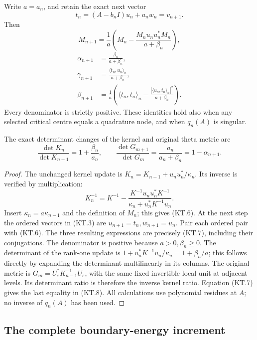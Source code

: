 \begin{theorem}
Write \(a=a_n\), and retain the exact next vector
\[
 t_n=(A-b_nI)u_n+a_nw_n=v_{n+1}.                         \tag{KT.5}
\]
Then
\[
 \boxed{M_{n+1}=\frac1a\left(M_n-
          \frac{M_nu_nu_n^*M_n}{a+\beta_n}\right),}       \tag{KT.6}
\]
\[
 \boxed{\begin{aligned}
 \alpha_{n+1}&=\frac{\beta_n}{a+\beta_n},\\
 \gamma_{n+1}&=\frac{\langle t_n,u_n\rangle_n}{a+\beta_n},\\
 \beta_{n+1}&=\frac1a\left(\langle t_n,t_n\rangle_n
             -\frac{|\langle u_n,t_n\rangle_n|^2}
                         {a+\beta_n}\right).
 \end{aligned}}                                         \tag{KT.7}
\]
Every denominator is strictly positive.  These identities hold
also when any selected critical centre equals a quadrature node,
and when \(q_n(A)\) is singular.

The exact determinant changes of the kernel and original theta
metric are
\[
 \boxed{\frac{\det K_n}{\det K_{n-1}}=1+\frac{\beta_n}{a_n},
 \qquad
 \frac{\det G_{m+1}}{\det G_m}
       =\frac{a_n}{a_n+\beta_n}=1-\alpha_{n+1}.}          \tag{KT.8}
\]
\end{theorem}

\begin{proof}
The unchanged kernel update is
\(K_n=K_{n-1}+u_nu_n^*/\kappa_n\).
Its inverse is verified by multiplication:
\[
 K_n^{-1}=K^{-1}-
   \frac{K^{-1}u_nu_n^*K^{-1}}{\kappa_n+u_n^*K^{-1}u_n}.
\]
Insert \(\kappa_n=a\kappa_{n-1}\) and the definition of
\(M_n\); this gives (KT.6).  At the next step the ordered vectors
in (KT.3) are \(u_{n+1}=t_n,w_{n+1}=u_n\).
Pair each ordered pair with (KT.6).  The three resulting expressions
are precisely (KT.7), including their conjugations.
The denominator is positive because \(a>0,\beta_n\geq0\).
The determinant of the rank-one update is
\(1+u_n^*K^{-1}u_n/\kappa_n=1+\beta_n/a\); this follows
directly by expanding the determinant multilinearly in its columns.
The original metric is
\(G_m=U_\varepsilon^*K_{n-1}^{-1}U_\varepsilon\), with the
same fixed invertible local unit at adjacent levels.  Its determinant
ratio is therefore the inverse kernel ratio.  Equation (KT.7) gives
the last equality in (KT.8).
All calculations use polynomial residues at \(A\); no inverse of
\(q_n(A)\) has been used.
\end{proof}

\subsection{The complete boundary-energy increment}

